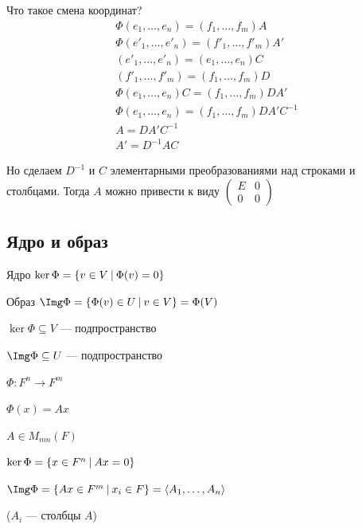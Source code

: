 Что такое смена координат?
\begin{gather*}
    \Phi(e_1, \ldots, e_n) = (f_1, \ldots, f_m) A
    \\
    \Phi(e'_1, \ldots, e'_n) = (f'_1, \ldots, f'_m) A'
    \\
    (e'_1, \ldots, e'_n) = (e_1, \ldots, e_n) C
    \\
    (f'_1, \ldots, f'_m) = (f_1, \ldots, f_m) D
    \\
    \Phi(e_1, \ldots, e_n) C = (f_1, \ldots, f_m) D A'
    \\
    \Phi(e_1, \ldots, e_n) = (f_1, \ldots, f_m) D A' C^{-1}
    \\
    A = D A' C^{-1}
    \\
    A' = D^{-1} A C
\end{gather*}

Но сделаем \( D^{-1} \) и \( C \) элементарными преобразованиями над строками и столбцами.
Тогда \( A \) можно привести к виду
\(
    \begin{pmatrix}
        E & 0
        \\
        0 & 0
    \end{pmatrix}
\)

\subsection{Ядро и образ}

\begin{defn}{Ядро}{}
    \( \ker \Phi = \{ v \in V \ \vline \ \Phi(v) = 0 \} \)
\end{defn}

\begin{defn}{Образ}{}
    \( \Img \Phi = \{ \Phi(v) \in U \ \vline \ v \in V \} = \Phi(V) \)
\end{defn}

\begin{remark}{}{}
    \( \ker \Phi \subseteq V \) --- подпространство

    \( \Img \Phi \subseteq U \) --- подпространство
\end{remark}

\begin{example}{}{}
    \( \Phi : F^n \to F^m \)

    \( \Phi(x) = Ax \)

    \( A \in M_{mn} (F) \)

    \( \ker \Phi = \{ x \in F^n \ \vline \ Ax = 0 \} \)

    \(
        \Img \Phi = \{ Ax \in F^m \ \vline \ x_i \in F \} = \langle A_1, \ldots, A_n \rangle
    \)

    (\( A_i \) --- столбцы \( A \))
\end{example}

